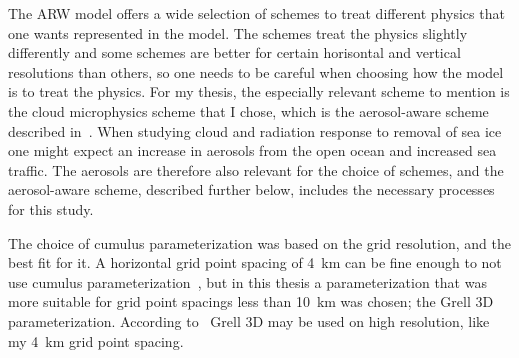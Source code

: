 The ARW model offers a wide selection of schemes to treat different physics that one wants represented in the model. The schemes treat the physics slightly differently and some schemes are better for certain horisontal and vertical resolutions than others, so one needs to be careful when choosing how the model is to treat the physics. For my thesis, the especially relevant scheme to mention is the cloud microphysics scheme that I chose, which is the aerosol-aware scheme described in~\citet{Thompson2014}. When studying cloud and radiation response to removal of sea ice one might expect an increase in aerosols from the open ocean and increased sea traffic. The aerosols are therefore also relevant for the choice of schemes, and the aerosol-aware scheme, described further below, includes the necessary processes for this study.

The choice of cumulus parameterization was based on the grid resolution, and the best fit for it. A horizontal grid point spacing of 4~km can be fine enough to not use cumulus parameterization~\citep{Thompson2014}, but in this thesis a parameterization that was more suitable for grid point spacings less than 10~km was chosen; the Grell 3D parameterization. According to~\citet{Wang2015} Grell 3D may be used on high resolution, like my 4~km grid point spacing.

